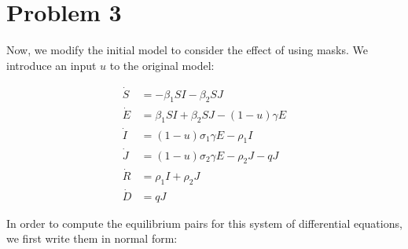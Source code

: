 \documentclass[letterpaper,twocolumn,10pt]{article}
\begin{document}
\section*{Problem 3}
Now, we modify the initial model to consider the effect of using masks. We introduce an input \(u\) to the original model:

\begin{equation*}
\begin{split}
\dot{S} &= -\beta_{1}SI - \beta_{2}SJ\\
\dot{E} &= \beta_{1}SI + \beta_{2}SJ - (1-u)\gamma E\\
\dot{I} &= (1-u)\sigma_{1}\gamma E - \rho_{1}I\\
\dot{J} &= (1-u)\sigma_{2}\gamma E - \rho_{2}J - qJ\\
\dot{R} &= \rho_{1}I + \rho_{2}J\\
\dot{D} &= qJ
\end{split}
\end{equation*}

In order to compute the equilibrium pairs for this system of differential equations, we first write them in normal form:
\end{document}
